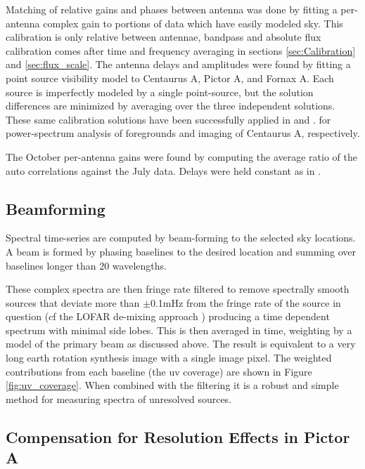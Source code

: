 \documentclass[preprint]{aastex}
\begin{document}
Matching of relative gains and phases between antenna was done by fitting a per-antenna complex gain to portions
of data which have easily modeled sky. 
This calibration is only relative between antennae, bandpass and absolute flux calibration
comes after time and frequency averaging in sections \ref{sec:Calibration} and \ref{sec:flux_scale}.   
The antenna delays and amplitudes were found by fitting a point source visibility
model to Centaurus A, Pictor A, and Fornax A.  Each source is imperfectly
modeled by a single point-source, but the solution differences are minimized by
averaging over the three independent solutions. These same calibration
solutions have been successfully applied in \citet{Pober:2013p9942} and \citet{Stefan:2013p9926}.
for power-spectrum analysis of foregrounds and imaging of Centaurus A, respectively.  

The October per-antenna gains were found by computing the average ratio of the auto correlations
against the July data. Delays were held constant as in \citet{Jacobs:2011p8438}. 



\subsection{Beamforming}
\label{sec:beamforming}
Spectral time-series are computed by beam-forming to the selected sky
locations. A beam is formed by phasing baselines to the desired location and
summing over baselines longer than 20 wavelengths.


 These complex spectra are then fringe rate filtered to remove spectrally
smooth sources that deviate more than $\pm$0.1mHz from the fringe rate of the source in question
 \citep{Parsons:2009p7859} (cf the LOFAR
de-mixing approach \citep{Offringa:2012p9691})  producing a time dependent
spectrum with minimal side lobes. This is then averaged in time,  weighting by a model of the primary
beam as discussed above.
The result is equivalent to
a very long earth rotation synthesis image with a single image pixel. The weighted
contributions from each baseline (the uv coverage) are shown in Figure \ref{fig:uv_coverage}.  When
combined with the filtering it is a robust and simple method for measuring
spectra of unresolved sources. 

\subsection{Compensation for Resolution Effects in Pictor A}
\end{document}
